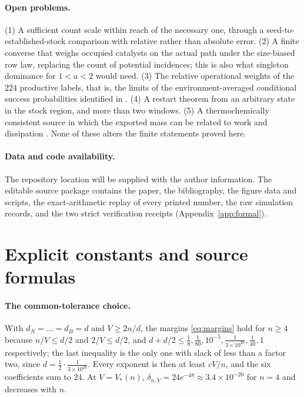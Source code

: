 \documentclass[11pt,letterpaper]{article}
\newcommand{\RepositoryNote}{The repository location will be supplied with the author information.}
\theoremstyle{plain}
\theoremstyle{definition}
\theoremstyle{remark}
\numberwithin{equation}{section}
\begin{document}
\paragraph{Open problems.}
(1) A sufficient count scale within reach of the necessary one, through a seed-to-established-stock comparison with relative rather than absolute error. (2) A finite converse that weighs occupied catalysts on the actual path under the size-biased row law, replacing the count of potential incidences; this is also what singleton dominance for $1<a<2$ would need. (3) The relative operational weights of the $224$ productive labels, that is, the limits of the environment-averaged conditional success probabilities identified in \cite{diffuse2026}. (4) A restart theorem from an arbitrary state in the stock region, and more than two windows. (5) A thermochemically consistent source in which the exported mass can be related to work and dissipation \cite{rao2016nonequilibrium}. None of these alters the finite statements proved here.

\paragraph{Data and code availability.}
\RepositoryNote{} The editable source package contains the paper, the bibliography, the figure data and scripts, the exact-arithmetic replay of every printed number, the raw simulation records, and the two strict verification receipts (Appendix~\ref{app:formal}).

\appendix

\section{Explicit constants and source formulas}\label{app:constants}

\paragraph{The common-tolerance choice.}
With $d_N=\dots=d_B=d$ and $V\ge2n/d$, the margins \eqref{eq:margins} hold for $n\ge4$ because $n/V\le d/2$ and $2/V\le d/2$, and $d+d/2\le\tfrac18,\tfrac1{80},10^{-5},\tfrac1{3\times10^{20}},\tfrac1{40},1$ respectively; the last inequality is the only one with slack of less than a factor two, since $d=\tfrac12\cdot\tfrac1{3\times10^{20}}$. Every exponent is then at least $cV/n$, and the six coefficients sum to $24$. At $V=V_*(n)$, $\delta_{n,V}=24e^{-48}\approx3.4\times10^{-20}$ for $n=4$ and decreases with $n$.
\end{document}
